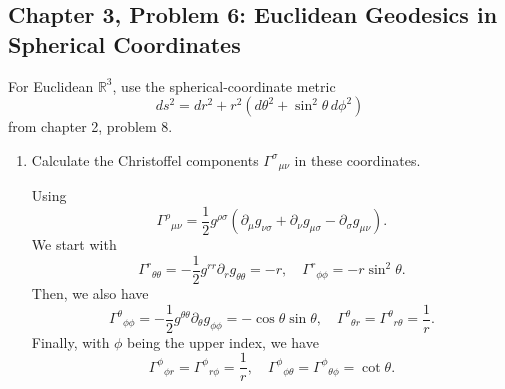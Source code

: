 \subsection{Chapter 3, Problem 6: Euclidean Geodesics in Spherical Coordinates}

For Euclidean $\mathbb R^3$, use the spherical-coordinate metric
\begin{equation}
    ds^2=dr^2+r^2\left(d\theta^2+\sin^2\theta\,d\phi^2\right)
\end{equation}
from chapter 2, problem 8.
\begin{enumerate}[label=\alph*)]
    \item Calculate the Christoffel components $\Gamma^\sigma{}_{\mu\nu}$ in
    these coordinates.
    \begin{solution}
        Using
        \begin{equation}
                \Gamma^\rho{}_{\mu\nu} = \frac{1}{2}g^{\rho\sigma}(\partial_\mu g_{\nu\sigma} + \partial_\nu g_{\mu\sigma} - \partial_\sigma g_{\mu\nu}).
        \end{equation}
        We start with
        \begin{equation}
            \Gamma^r{}_{\theta\theta} = -\frac{1}{2}g^{rr}\partial_r g_{\theta\theta} = -r, \quad\Gamma^r{}_{\phi\phi} = -r\sin^2\theta.
        \end{equation}
        Then, we also have
        \begin{equation}
            \Gamma^\theta{}_{\phi\phi} = -\frac{1}{2}g^{\theta\theta}\partial_\theta g_{\phi\phi} = -\cos\theta \sin\theta, \quad \Gamma^\theta{}_{\theta r} = \Gamma^\theta{}_{r\theta} = \frac{1}{r}.
        \end{equation}
        Finally, with $\phi$ being the upper index, we have
        \begin{equation}
            \Gamma^\phi{}_{\phi r} = \Gamma^\phi{}_{r\phi} = \frac{1}{r}, \quad \Gamma^\phi{}_{\phi \theta} = \Gamma^\phi{}_{\theta \phi} =  \cot \theta.
        \end{equation}

    \end{solution}


\end{enumerate}
